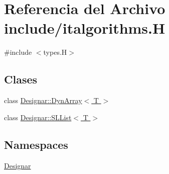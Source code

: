 \hypertarget{italgorithms_8_h}{}\section{Referencia del Archivo include/italgorithms.H}
\label{italgorithms_8_h}
{\ttfamily \#include $<$types.\+H$>$}\newline
\subsection*{Clases}
\begin{DoxyCompactItemize}
\item 
class \hyperlink{class_designar_1_1_dyn_array}{Designar\+::\+Dyn\+Array$<$ T $>$}
\item 
class \hyperlink{class_designar_1_1_s_l_list}{Designar\+::\+S\+L\+List$<$ T $>$}
\end{DoxyCompactItemize}
\subsection*{Namespaces}
\begin{DoxyCompactItemize}
\item 
 \hyperlink{namespace_designar}{Designar}
\end{DoxyCompactItemize}
